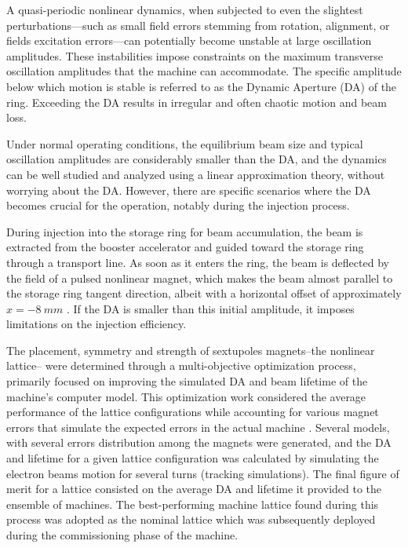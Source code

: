 A quasi-periodic nonlinear dynamics, when subjected to even the slightest perturbations—such as small field errors stemming from rotation, alignment, or fields excitation errors—can potentially become unstable at large oscillation amplitudes. These instabilities impose constraints on the maximum transverse oscillation amplitudes that the machine can accommodate. The specific amplitude below which motion is stable is referred to as the Dynamic Aperture (DA) of the ring. Exceeding the DA results in irregular and often chaotic motion and beam loss.

Under normal operating conditions, the equilibrium beam size and typical oscillation amplitudes are considerably smaller than the DA, and the dynamics can be well studied and analyzed using a linear approximation theory, without worrying about the DA. However, there are specific scenarios where the DA becomes crucial for the operation, notably during the injection process.

During injection into the storage ring for beam accumulation, the beam is extracted from the booster accelerator and guided toward the storage ring through a transport line. As soon as it enters the ring, the beam is deflected by the field of a pulsed nonlinear magnet, which makes the beam almost parallel to the storage ring tangent direction, albeit with a horizontal offset of approximately $x=-8~\unit{mm}$ \cite{liu_injection_2016}. If the DA is smaller than this initial amplitude, it imposes limitations on the injection efficiency.

The placement, symmetry and strength of sextupoles magnets--the nonlinear lattice-- were determined through a multi-objective optimization process, primarily focused on improving the simulated DA and beam lifetime of the machine's computer model\cite{de_sa_optimization_2016, dester_energy_2017}. This optimization work considered the average performance of the lattice configurations while accounting for various magnet errors that simulate the expected errors in the actual machine \cite{de_sa_optimization_2016}. Several models, with several errors distribution among the magnets were generated, and the DA and lifetime for a given lattice configuration was calculated by simulating the electron beams motion for several turns (tracking simulations). The final figure of merit for a lattice consisted on the average DA and lifetime it provided to the ensemble of machines. The best-performing machine lattice found during this process was adopted as the nominal lattice which was subsequently deployed during the commissioning phase of the machine.

